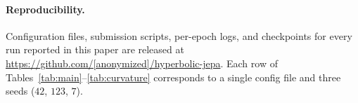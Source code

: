 \documentclass{article}
\begin{document}
\paragraph{Reproducibility.}
Configuration files, submission scripts, per-epoch logs, and checkpoints for every run reported in this paper are released at \url{https://github.com/[anonymized]/hyperbolic-jepa}. Each row of Tables~\ref{tab:main}--\ref{tab:curvature} corresponds to a single config file and three seeds ($42$, $123$, $7$).

\begin{small}


\end{small}
\end{document}
